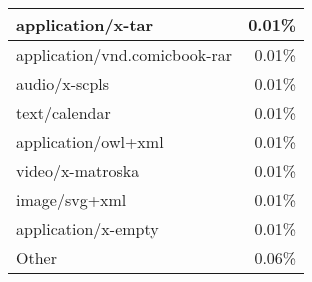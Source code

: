 \begin{center}
\begin{supertabular}[H]{l|r}
	\hline
	application/x-tar	&	0.01\% \\
	\hline
	application/vnd.comicbook-rar	&	0.01\% \\
	\hline
	audio/x-scpls		&	0.01\% \\
	\hline
	text/calendar		&	0.01\% \\
	\hline
	application/owl+xml	&	0.01\% \\
	\hline
	video/x-matroska	&	0.01\% \\
	\hline
	image/svg+xml		&	0.01\% \\
	\hline
	application/x-empty	&	0.01\% \\
	\hline
	Other				&	0.06\% \\
	\hline
\end{supertabular}
\end{center}
\fi


%
%
